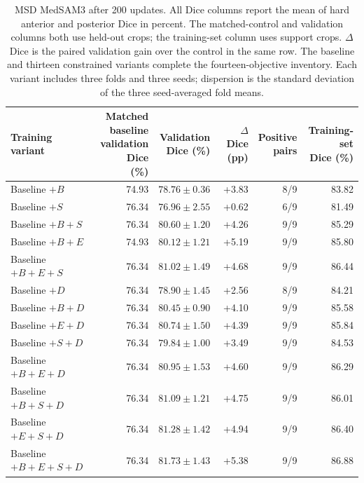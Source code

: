 \documentclass[12pt,a4paper]{article}
\begin{document}
\begin{table}[htbp]
\centering\footnotesize{}
\setlength{\tabcolsep}{4pt}
\renewcommand{\arraystretch}{1.15}
\begin{tabular}{@{}lrrrrr@{}}
\hline
\shortstack{Training\\variant} & \shortstack{Matched baseline\\validation Dice\\(\%)} & \shortstack{Validation\\Dice (\%)} & \shortstack{$\Delta$ Dice\\(pp)} & \shortstack{Positive\\pairs} & \shortstack{Training-set\\Dice (\%)} \\
\hline
Baseline $+B$ & 74.93 & $78.76\pm0.36$ & +3.83 & 8/9 & 83.82 \\
Baseline $+S$ & 76.34 & $76.96\pm2.55$ & +0.62 & 6/9 & 81.49 \\
Baseline $+B+S$ & 76.34 & $80.60\pm1.20$ & +4.26 & 9/9 & 85.29 \\
Baseline $+B+E$ & 74.93 & $80.12\pm1.21$ & +5.19 & 9/9 & 85.80 \\
Baseline $+B+E+S$ & 76.34 & $81.02\pm1.49$ & +4.68 & 9/9 & 86.44 \\
Baseline $+D$ & 76.34 & $78.90\pm1.45$ & +2.56 & 8/9 & 84.21 \\
Baseline $+B+D$ & 76.34 & $80.45\pm0.90$ & +4.10 & 9/9 & 85.58 \\
Baseline $+E+D$ & 76.34 & $80.74\pm1.50$ & +4.39 & 9/9 & 85.84 \\
Baseline $+S+D$ & 76.34 & $79.84\pm1.00$ & +3.49 & 9/9 & 84.53 \\
Baseline $+B+E+D$ & 76.34 & $80.95\pm1.53$ & +4.60 & 9/9 & 86.29 \\
Baseline $+B+S+D$ & 76.34 & $81.09\pm1.21$ & +4.75 & 9/9 & 86.01 \\
Baseline $+E+S+D$ & 76.34 & $81.28\pm1.42$ & +4.94 & 9/9 & 86.40 \\
Baseline $+B+E+S+D$ & 76.34 & $81.73\pm1.43$ & +5.38 & 9/9 & 86.88 \\
\hline
\end{tabular}
\caption{MSD MedSAM3 after 200 updates. All Dice columns report the
mean of hard anterior and posterior Dice in percent. The matched-control
and validation columns both use held-out crops; the training-set column
uses support crops. $\Delta$ Dice is the paired validation gain over the
control in the same row. The baseline and thirteen constrained variants
complete the fourteen-objective inventory. Each variant includes three
folds and three seeds; dispersion is the standard deviation of the
three seed-averaged fold means.}
\label{tab:medsam-msd-noaug}
\label{tab:medsam-msd-original-noaug}
\end{table}
\end{document}
